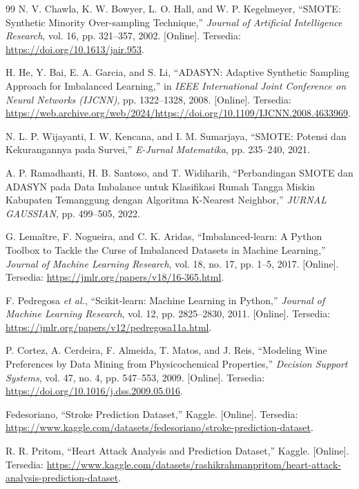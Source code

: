 \documentclass[a4paper,oneside,12pt]{report}
\begin{document}
\begin{thebibliography}{99}
     N. V. Chawla, K. W. Bowyer, L. O. Hall, and W. P. Kegelmeyer, ``SMOTE: Synthetic Minority Over-sampling Technique,'' \textit{Journal of Artificial Intelligence Research}, vol. 16, pp. 321--357, 2002. [Online]. Tersedia: \url{https://doi.org/10.1613/jair.953}.

     H. He, Y. Bai, E. A. Garcia, and S. Li, ``ADASYN: Adaptive Synthetic Sampling Approach for Imbalanced Learning,'' in \textit{IEEE International Joint Conference on Neural Networks (IJCNN)}, pp. 1322--1328, 2008. [Online]. Tersedia: \url{https://web.archive.org/web/2024/https://doi.org/10.1109/IJCNN.2008.4633969}.

     N. L. P. Wijayanti, I. W. Kencana, and I. M. Sumarjaya, ``SMOTE: Potensi dan Kekurangannya pada Survei,'' \textit{E-Jurnal Matematika}, pp. 235--240, 2021.

     A. P. Ramadhanti, H. B. Santoso, and T. Widiharih, ``Perbandingan SMOTE dan ADASYN pada Data Imbalance untuk Klasifikasi Rumah Tangga Miskin Kabupaten Temanggung dengan Algoritma K-Nearest Neighbor,'' \textit{JURNAL GAUSSIAN}, pp. 499--505, 2022.

     G. Lemaître, F. Nogueira, and C. K. Aridas, ``Imbalanced-learn: A Python Toolbox to Tackle the Curse of Imbalanced Datasets in Machine Learning,'' \textit{Journal of Machine Learning Research}, vol. 18, no. 17, pp. 1--5, 2017. [Online]. Tersedia: \url{https://jmlr.org/papers/v18/16-365.html}.

     F. Pedregosa \textit{et al.}, ``Scikit-learn: Machine Learning in Python,'' \textit{Journal of Machine Learning Research}, vol. 12, pp. 2825--2830, 2011. [Online]. Tersedia: \url{https://jmlr.org/papers/v12/pedregosa11a.html}.

     P. Cortez, A. Cerdeira, F. Almeida, T. Matos, and J. Reis, ``Modeling Wine Preferences by Data Mining from Physicochemical Properties,'' \textit{Decision Support Systems}, vol. 47, no. 4, pp. 547--553, 2009. [Online]. Tersedia: \url{https://doi.org/10.1016/j.dss.2009.05.016}.

     Fedesoriano, ``Stroke Prediction Dataset,'' Kaggle. [Online]. Tersedia: \url{https://www.kaggle.com/datasets/fedesoriano/stroke-prediction-dataset}.

     R. R. Pritom, ``Heart Attack Analysis and Prediction Dataset,'' Kaggle. [Online]. Tersedia: \url{https://www.kaggle.com/datasets/rashikrahmanpritom/heart-attack-analysis-prediction-dataset}.


\end{thebibliography}
\end{document}
